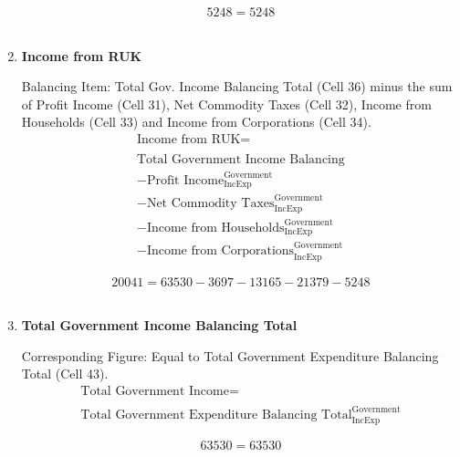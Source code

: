 \begin{enumerate}
\begin{equation} \nonumber
5248 = 5248
\end{equation}\\


\item \textbf {Income from RUK}

Balancing Item: Total Gov. Income Balancing Total (Cell 36) minus the sum of Profit Income (Cell 31), Net Commodity Taxes (Cell 32), Income from Households (Cell 33) and Income from Corporations (Cell 34).\\

\begin{equation}
\begin{split}
\text{Income from RUK} =  \\ \\
\text{Total Government Income Balancing}\\
-\text{Profit Income}^\text{Government}_\text{IncExp}\\
-\text{Net Commodity Taxes}^\text{Government}_\text{IncExp}\\
-\text{Income from Households}^\text{Government}_\text{IncExp}\\
-\text{Income from Corporations}^\text{Government}_\text{IncExp}
\end{split} \label{eq:2.5.39}
\end{equation}

\begin{equation} \nonumber
20041 = 63530-3697-13165-21379-5248
\end{equation}\\


\item \textbf {Total Government Income Balancing Total}

Corresponding Figure: Equal to Total Government Expenditure Balancing Total (Cell 43).\\

\begin{equation}
\begin{split}
\text{Total Government Income} =  \\ \\
\text{Total Government Expenditure Balancing Total}^\text{Government}_\text{IncExp}
\end{split} \label{eq:2.5.40}
\end{equation}

\begin{equation} \nonumber
63530 = 63530
\end{equation}\\




\end{enumerate}
